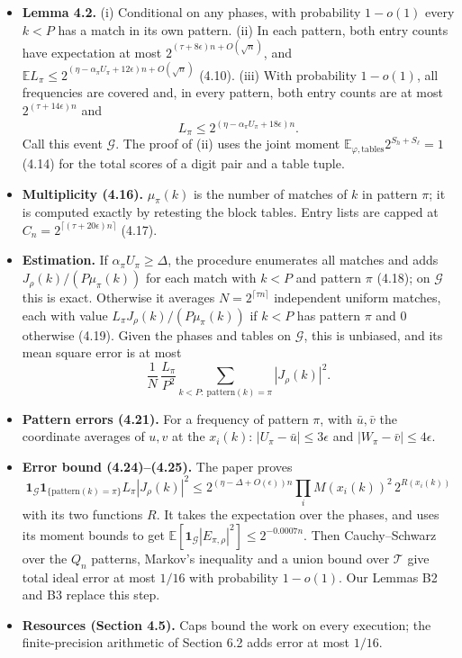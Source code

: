 \documentclass[10pt,a4paper]{article}
\begin{document}
\begin{itemize}
\item \textbf{Lemma 4.2.} (i) Conditional on any phases, with probability $1 - o(1)$ every $k < P$ has a match in its own pattern.
(ii) In each pattern, both entry counts have expectation at most $2^{(\tau + 8\epsilon)n + O(\sqrt n)}$, and
$\mathbb E L_\pi \le 2^{(\eta - \alpha_\pi U_\pi + 12\epsilon)n + O(\sqrt n)}$ (4.10). (iii) With probability $1 - o(1)$,
all frequencies are covered and, in every pattern, both entry counts are at most $2^{(\tau + 14\epsilon)n}$ and
\[L_\pi \le 2^{(\eta - \alpha_\pi U_\pi + 18\epsilon)n}. \tag{4.11}\]
Call this event $\mathcal G$. The proof of (ii) uses the joint moment
$\mathbb E_{\varphi,\text{tables}}2^{S_h + S_\ell} = 1$ (4.14) for the total scores of a digit pair and a table tuple.
\item \textbf{Multiplicity (4.16).} $\mu_\pi(k)$ is the number of matches of $k$ in pattern $\pi$; it is computed exactly by
retesting the block tables. Entry lists are capped at $C_n = 2^{\lceil(\tau + 20\epsilon)n\rceil}$ (4.17).
\item \textbf{Estimation.} If $\alpha_\pi U_\pi \ge \Delta$, the procedure enumerates all matches and adds
$J_\rho(k)/(P\mu_\pi(k))$ for each match with $k < P$ and pattern $\pi$ (4.18); on $\mathcal G$ this is exact. Otherwise
it averages $N = 2^{\lceil\tau n\rceil}$ independent uniform matches, each with value $L_\pi J_\rho(k)/(P\mu_\pi(k))$ if
$k < P$ has pattern $\pi$ and 0 otherwise (4.19). Given the phases and tables on $\mathcal G$, this is unbiased, and its
mean square error is at most
\[\frac1N\,\frac{L_\pi}{P^2}\sum_{k < P:\ \mathrm{pattern}(k) = \pi}|J_\rho(k)|^2. \tag{4.20}\]
\item \textbf{Pattern errors (4.21).} For a frequency of pattern $\pi$, with $\bar u, \bar v$ the coordinate averages of $u, v$ at
the $x_i(k)$: $|U_\pi - \bar u| \le 3\epsilon$ and $|W_\pi - \bar v| \le 4\epsilon$.
\item \textbf{Error bound (4.24)--(4.25).} The paper proves
\[\mathbf 1_{\mathcal G}\mathbf 1_{\{\mathrm{pattern}(k)=\pi\}}L_\pi|J_\rho(k)|^2 \le
2^{(\eta - \Delta + O(\epsilon))n}\prod_iM(x_i(k))^2\,2^{R(x_i(k))}\]
with its two functions $R$. It takes the expectation
over the phases, and uses its moment bounds to get $\mathbb E[\mathbf 1_{\mathcal G}|E_{\pi,\rho}|^2] \le 2^{-0.0007n}$.
Then Cauchy--Schwarz over the $Q_n$ patterns, Markov's inequality and a union bound over $\mathcal T$ give total ideal
error at most $1/16$ with probability $1 - o(1)$. Our Lemmas B2 and B3 replace this step.
\item \textbf{Resources (Section 4.5).} Caps bound the work on every execution; the finite-precision arithmetic of Section 6.2
adds error at most $1/16$.
\end{itemize}
\end{document}
